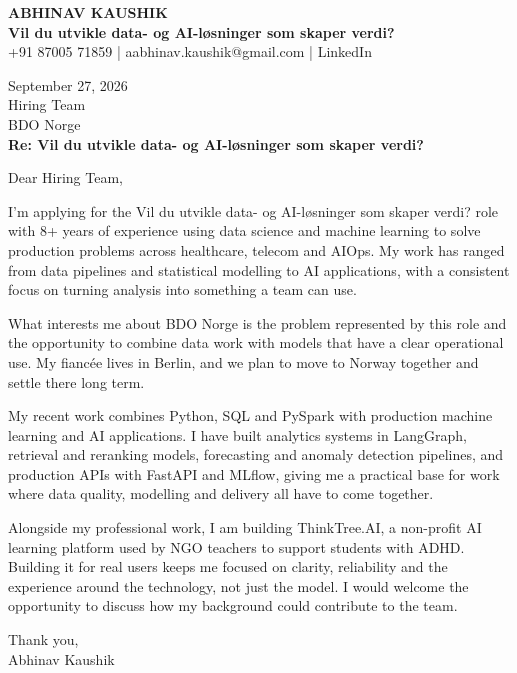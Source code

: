 \documentclass[10pt,a4paper]{article}
\begin{document}
\begin{center}
{\Large\bfseries ABHINAV KAUSHIK}\\[2pt]
{\bfseries Vil du utvikle data- og AI-løsninger som skaper verdi?}\\[2pt]
+91 87005 71859 \quad | \quad aabhinav.kaushik@gmail.com \quad | \quad LinkedIn
\end{center}
\vspace{8pt}
September 27, 2026\\[6pt]
Hiring Team\\
BDO Norge\\[4pt]
\textbf{Re: Vil du utvikle data- og AI-løsninger som skaper verdi?}

Dear Hiring Team,

I’m applying for the Vil du utvikle data- og AI-løsninger som skaper verdi? role with 8+ years of experience using data science and machine learning to solve production problems across healthcare, telecom and AIOps. My work has ranged from data pipelines and statistical modelling to AI applications, with a consistent focus on turning analysis into something a team can use.

What interests me about BDO Norge is the problem represented by this role and the opportunity to combine data work with models that have a clear operational use. My fiancée lives in Berlin, and we plan to move to Norway together and settle there long term.

My recent work combines Python, SQL and PySpark with production machine learning and AI applications. I have built analytics systems in LangGraph, retrieval and reranking models, forecasting and anomaly detection pipelines, and production APIs with FastAPI and MLflow, giving me a practical base for work where data quality, modelling and delivery all have to come together.

Alongside my professional work, I am building ThinkTree.AI, a non-profit AI learning platform used by NGO teachers to support students with ADHD. Building it for real users keeps me focused on clarity, reliability and the experience around the technology, not just the model. I would welcome the opportunity to discuss how my background could contribute to the team.

Thank you,\\
Abhinav Kaushik
\end{document}
